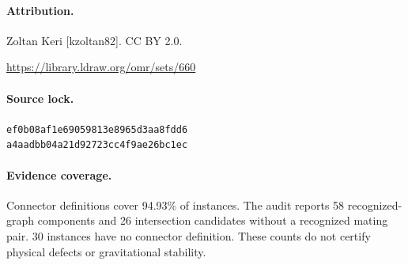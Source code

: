\paragraph{Attribution.}Zoltan Keri [kzoltan82]. CC BY 2.0.\par\noindent\url{https://library.ldraw.org/omr/sets/660}
\paragraph{Source lock.}\small\texttt{ef0b08af1e69059813e8965d3aa8fdd6}\\\texttt{a4aadbb04a21d92723cc4f9ae26bc1ec}\normalsize
\paragraph{Evidence coverage.}Connector definitions cover 94.93\% of instances. The audit reports 58 recognized-graph components and 26 intersection candidates without a recognized mating pair. 30 instances have no connector definition. These counts do not certify physical defects or gravitational stability.
